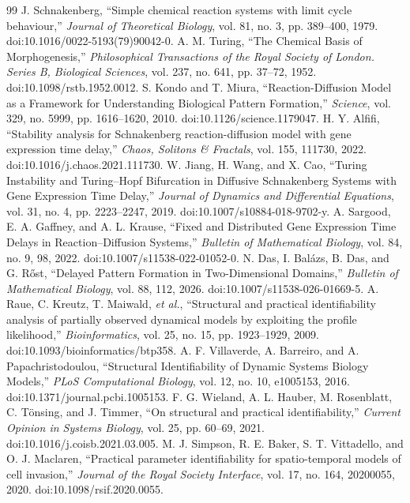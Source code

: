 \documentclass[preprint,11pt]{elsarticle}
\begin{document}
\begin{thebibliography}{99}
 J. Schnakenberg, ``Simple chemical reaction systems with limit cycle behaviour,'' \emph{Journal of Theoretical Biology}, vol. 81, no. 3, pp. 389--400, 1979. doi:10.1016/0022-5193(79)90042-0.
 A. M. Turing, ``The Chemical Basis of Morphogenesis,'' \emph{Philosophical Transactions of the Royal Society of London. Series B, Biological Sciences}, vol. 237, no. 641, pp. 37--72, 1952. doi:10.1098/rstb.1952.0012.
 S. Kondo and T. Miura, ``Reaction-Diffusion Model as a Framework for Understanding Biological Pattern Formation,'' \emph{Science}, vol. 329, no. 5999, pp. 1616--1620, 2010. doi:10.1126/science.1179047.
 H. Y. Alfifi, ``Stability analysis for Schnakenberg reaction-diffusion model with gene expression time delay,'' \emph{Chaos, Solitons \& Fractals}, vol. 155, 111730, 2022. doi:10.1016/j.chaos.2021.111730.
 W. Jiang, H. Wang, and X. Cao, ``Turing Instability and Turing--Hopf Bifurcation in Diffusive Schnakenberg Systems with Gene Expression Time Delay,'' \emph{Journal of Dynamics and Differential Equations}, vol. 31, no. 4, pp. 2223--2247, 2019. doi:10.1007/s10884-018-9702-y.
 A. Sargood, E. A. Gaffney, and A. L. Krause, ``Fixed and Distributed Gene Expression Time Delays in Reaction--Diffusion Systems,'' \emph{Bulletin of Mathematical Biology}, vol. 84, no. 9, 98, 2022. doi:10.1007/s11538-022-01052-0.
 N. Das, I. Bal\'azs, B. Das, and G. R\H{o}st, ``Delayed Pattern Formation in Two-Dimensional Domains,'' \emph{Bulletin of Mathematical Biology}, vol. 88, 112, 2026. doi:10.1007/s11538-026-01669-5.
 A. Raue, C. Kreutz, T. Maiwald, \emph{et al.}, ``Structural and practical identifiability analysis of partially observed dynamical models by exploiting the profile likelihood,'' \emph{Bioinformatics}, vol. 25, no. 15, pp. 1923--1929, 2009. doi:10.1093/bioinformatics/btp358.
 A. F. Villaverde, A. Barreiro, and A. Papachristodoulou, ``Structural Identifiability of Dynamic Systems Biology Models,'' \emph{PLoS Computational Biology}, vol. 12, no. 10, e1005153, 2016. doi:10.1371/journal.pcbi.1005153.
 F. G. Wieland, A. L. Hauber, M. Rosenblatt, C. T\"onsing, and J. Timmer, ``On structural and practical identifiability,'' \emph{Current Opinion in Systems Biology}, vol. 25, pp. 60--69, 2021. doi:10.1016/j.coisb.2021.03.005.
 M. J. Simpson, R. E. Baker, S. T. Vittadello, and O. J. Maclaren, ``Practical parameter identifiability for spatio-temporal models of cell invasion,'' \emph{Journal of the Royal Society Interface}, vol. 17, no. 164, 20200055, 2020. doi:10.1098/rsif.2020.0055.

\end{thebibliography}
\end{document}
